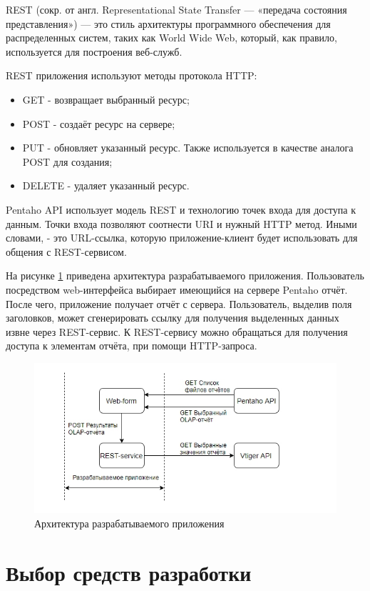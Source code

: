 REST (сокр. от англ. Representational State Transfer — «передача состояния представления») — это стиль архитектуры программного обеспечения для распределенных систем, таких как World Wide Web, который, как правило, используется для построения веб-служб.\cite{rest}

REST приложения используют методы протокола HTTP:

\begin{itemize}
	\item GET - возвращает выбранный ресурс;
	\item POST - создаёт ресурс на сервере;
	\item PUT - обновляет указанный ресурс. Также используется в качестве аналога POST для создания;
	\item DELETE - удаляет указанный ресурс.
\end{itemize}

Pentaho API использует модель REST и технологию точек входа для доступа к данным. Точки входа позволяют соотнести URI и нужный HTTP метод. Иными словами, - это URL-ссылка, которую приложение-клиент будет использовать для общения с REST-сервисом.

На рисунке \ref{fig:structure} приведена архитектура разрабатываемого приложения. Пользователь посредством web-интерфейса выбирает имеющийся на сервере Pentaho отчёт. После чего, приложение получает отчёт с сервера. Пользователь, выделив поля заголовков, может сгенерировать ссылку для получения выделенных данных извне через REST-сервис. К REST-сервису можно обращаться для получения доступа к элементам отчёта, при помощи HTTP-запроса. 

\begin{figure}[htbp]
	\centering
	\includegraphics[width=.9\textwidth]{fig/chapter_3/structure}
	\caption{Архитектура разрабатываемого приложения}
	\label{fig:structure}
\end{figure}

\section{Выбор средств разработки}

